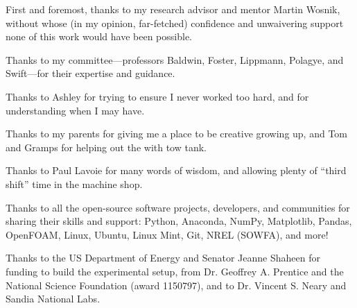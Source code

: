 



\begin{Acknowledgments}
\setlength{\baselineskip}{1.5\baselineskip}
{

    First and foremost, thanks to my research advisor and mentor Martin Wosnik,
    without whose (in my opinion, far-fetched) confidence and unwaivering
    support none of this work would have been possible.

    Thanks to my committee---professors Baldwin, Foster, Lippmann, Polagye, and
    Swift---for their expertise and guidance.

    Thanks to Ashley for trying to ensure I never worked too hard, and for
    understanding when I may have.

    Thanks to my parents for giving me a place to be creative growing up, and
    Tom and Gramps for helping out the with tow tank.

    Thanks to Paul Lavoie for many words of wisdom, and allowing plenty of
    ``third shift'' time in the machine shop.

    Thanks to all the open-source software projects, developers, and communities
    for sharing their skills and support: Python, Anaconda, NumPy, Matplotlib,
    Pandas, OpenFOAM, Linux, Ubuntu, Linux Mint, Git, NREL (SOWFA), and more!

    Thanks to the US Department of Energy and Senator Jeanne Shaheen for funding
    to build the experimental setup, from Dr. Geoffrey A. Prentice and the
    National Science Foundation (award 1150797), and to Dr. Vincent S. Neary and
    Sandia National Labs.


}
\end{Acknowledgments}

